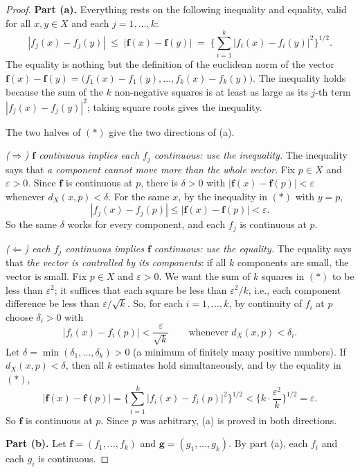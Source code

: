 \documentclass{article}
\theoremstyle{mythm}
\begin{document}
\begin{proof}
\textbf{Part (a).} Everything rests on the following inequality and equality, valid for all $x, y \in X$ and each $j = 1, \dots, k$:
\[
|f_j(x) - f_j(y)| \;\leq\; |\mathbf{f}(x) - \mathbf{f}(y)| \;=\; \Big\{ \sum_{i=1}^k |f_i(x) - f_i(y)|^2 \Big\}^{1/2}. \tag{$*$}
\]
The equality is nothing but the definition of the euclidean norm of the vector $\mathbf{f}(x) - \mathbf{f}(y) = \big(f_1(x) - f_1(y), \dots, f_k(x) - f_k(y)\big)$. The inequality holds because the sum of the $k$ non-negative squares is at least as large as its $j$-th term $|f_j(x)-f_j(y)|^2$; taking square roots gives the inequality.

The two halves of $(*)$ give the two directions of (a).

\textit{($\Rightarrow$) $\mathbf{f}$ continuous implies each $f_j$ continuous: use the inequality.} The inequality says that \textit{a component cannot move more than the whole vector}. Fix $p \in X$ and $\varepsilon > 0$. Since $\mathbf{f}$ is continuous at $p$, there is $\delta > 0$ with $|\mathbf{f}(x) - \mathbf{f}(p)| < \varepsilon$ whenever $d_X(x,p) < \delta$. For the same $x$, by the inequality in $(*)$ with $y = p$,
\[
|f_j(x) - f_j(p)| \leq |\mathbf{f}(x) - \mathbf{f}(p)| < \varepsilon.
\]
So the same $\delta$ works for every component, and each $f_j$ is continuous at $p$.

\textit{($\Leftarrow$) each $f_j$ continuous implies $\mathbf{f}$ continuous: use the equality.} The equality says that \textit{the vector is controlled by its components}: if all $k$ components are small, the vector is small. Fix $p \in X$ and $\varepsilon > 0$. We want the sum of $k$ squares in $(*)$ to be less than $\varepsilon^2$; it suffices that each square be less than $\varepsilon^2/k$, i.e., each component difference be less than $\varepsilon/\sqrt{k}$. So, for each $i = 1, \dots, k$, by continuity of $f_i$ at $p$ choose $\delta_i > 0$ with
\[
|f_i(x) - f_i(p)| < \frac{\varepsilon}{\sqrt{k}} \qquad \text{whenever } d_X(x,p) < \delta_i.
\]
Let $\delta = \min(\delta_1, \dots, \delta_k) > 0$ (a minimum of finitely many positive numbers). If $d_X(x,p) < \delta$, then all $k$ estimates hold simultaneously, and by the equality in $(*)$,
\[
|\mathbf{f}(x) - \mathbf{f}(p)| = \Big\{\sum_{i=1}^k |f_i(x) - f_i(p)|^2\Big\}^{1/2} < \Big\{ k \cdot \frac{\varepsilon^2}{k} \Big\}^{1/2} = \varepsilon.
\]
So $\mathbf{f}$ is continuous at $p$. Since $p$ was arbitrary, (a) is proved in both directions.

\textbf{Part (b).} Let $\mathbf{f} = (f_1, \dots, f_k)$ and $\mathbf{g} = (g_1, \dots, g_k)$. By part (a), each $f_i$ and each $g_i$ is continuous.


\end{proof}
\end{document}
